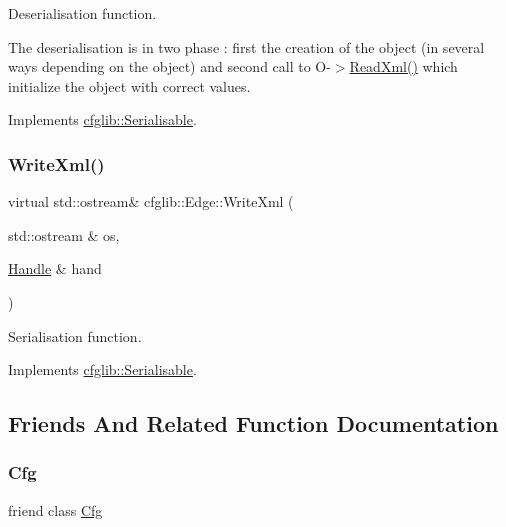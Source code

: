 Deserialisation function.

The deserialisation is in two phase \+: first the creation of the object (in several ways depending on the object) and second call to O-\/$>$\hyperlink{classcfglib_1_1Edge_af7eb95612c30e993771c519a2240cd77}{Read\+Xml()} which initialize the object with correct values. 

Implements \hyperlink{classcfglib_1_1Serialisable_a876d530446317872259356af9b016e13}{cfglib\+::\+Serialisable}.

\mbox{\label{classcfglib_1_1Edge_af65bccb04bf1bad3f8a99d0b279836e0}} 
\subsubsection{\texorpdfstring{Write\+Xml()}{WriteXml()}}
{\footnotesize\ttfamily virtual std\+::ostream\& cfglib\+::\+Edge\+::\+Write\+Xml (\begin{DoxyParamCaption}\item[{std\+::ostream \&}]{os,  }\item[{\hyperlink{classcfglib_1_1Handle}{Handle} \&}]{hand }\end{DoxyParamCaption})\hspace{0.3cm}{\ttfamily [virtual]}}

Serialisation function. 

Implements \hyperlink{classcfglib_1_1Serialisable_aaeb80cc7397ad312e5ae34f39412ce42}{cfglib\+::\+Serialisable}.



\subsection{Friends And Related Function Documentation}
\mbox{\label{classcfglib_1_1Edge_aad28e913031e836a51d46ca3a1a3b68b}} 
\subsubsection{\texorpdfstring{Cfg}{Cfg}}
{\footnotesize\ttfamily friend class \hyperlink{classcfglib_1_1Cfg}{Cfg}\hspace{0.3cm}{\ttfamily [friend]}}

